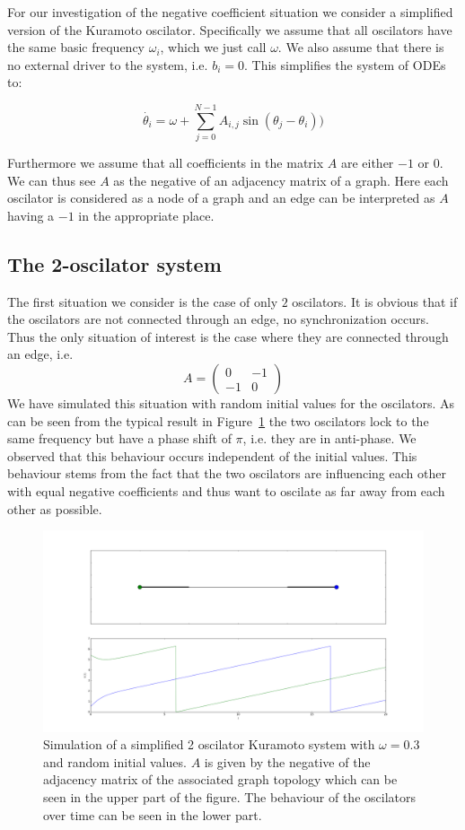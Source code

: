 \label{sec:negative}
For our investigation of the negative coefficient situation we consider a simplified version of the Kuramoto oscilator. Specifically we assume that all oscilators have the same basic frequency $\omega_i$, which we just call $\omega$. We also assume that there is no external driver to the system, i.e. $b_i = 0$. This simplifies the system of ODEs to: 

\[
\dot{\theta_i} = \omega + \sum_{j = 0}^{N - 1}{A_{i, j}\sin({\theta_j - \theta_i})}
)\]

Furthermore we assume that all coefficients in the matrix $A$ are either $-1$ or $0$. We can thus see $A$ as the negative of an adjacency matrix of a graph. Here each oscilator is considered as a node of a graph and an edge can be interpreted as $A$ having a $-1$ in the appropriate place. 

\subsection{The 2-oscilator system}

The first situation we consider is the case of only $2$ oscilators. It is obvious that if the oscilators are not connected through an edge, no synchronization occurs. Thus the only situation of interest is the case where they are connected through an edge, i.e. 
\[
  A = \left( \begin{array}{cc} 0 & -1\\ -1 & 0 \end{array} \right)
\]
We have simulated this situation with random initial values for the oscilators. As can be seen from the typical result in Figure~\ref{fig:negative_2_osc} the two oscilators lock to the same frequency but have a phase shift of $\pi$, i.e. they are in anti-phase. We observed that this behaviour occurs independent of the initial values. This behaviour stems from the fact that the two oscilators are influencing each other with equal negative coefficients and thus want to oscilate as far away from each other as possible. 

\begin{figure}[h]
  \centering
  \includegraphics[width=\textwidth]{imgs/simple_2_osc}
  \caption{Simulation of a simplified 2 oscilator Kuramoto system with $\omega = 0.3$ and random initial values. $A$ is given by the negative of the adjacency matrix of the associated graph topology which can be seen in the upper part of the figure. The behaviour of the oscilators over time can be seen in the lower part. }
  \label{fig:negative_2_osc}
\end{figure}

